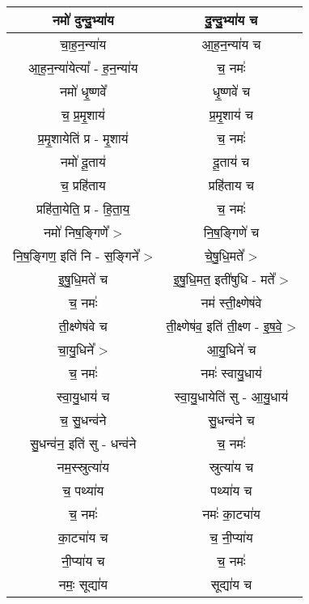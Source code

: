 \subsection{}
{\centering
\begin{longtable}{|c|c|}
\hline
नमो॑ दुन्दु॒भ्या॑य              & दु॒न्दु॒भ्या॑य च\\
\hline
चा॒ह॒न॒न्या॑य                 & आ॒ह॒न॒न्या॑य च\\
\hline
आ॒ह॒न॒न्या॑येत्या᳚ - ह॒न॒न्या॑य      & च॒ नमः॑\\
\hline
नमो॑ धृ॒ष्णवे᳚                 & धृ॒ष्णवे॑ च\\
\hline
च॒ प्र॒मृ॒शाय॑                 & प्र॒मृ॒शाय॑ च\\
\hline
प्र॒मृ॒शायेति॑ प्र - मृ॒शाय॑       & च॒ नमः॑\\
\hline
नमो॑ दू॒ताय॑                 & दू॒ताय॑ च\\
\hline
च॒ प्रहि॑ताय                & प्रहि॑ताय च\\
\hline
प्रहि॑ता॒येति॒ प्र - हि॒ता॒य॒     & च॒ नमः॑\\
\hline
नमो॑ निष॒ङ्गिणे᳚ >            & नि॒ष॒ङ्गिणे॑ च\\
\hline
नि॒ष॒ङ्गिण॒ इति॑ नि - स॒ङ्गिने᳚ > & चे॒षु॒धि॒मते᳚ >\\
\hline
इ॒षु॒धि॒मते॑ च                 & इ॒षु॒धि॒मत॒ इती॑षुधि - मते᳚ >\\
\hline
च॒ नमः॑                    & नम॑ स्ती॒क्ष्णेष॑वे\\
\hline
ती॒क्ष्णेष॑वे च                & ती॒क्ष्णेष॑व॒ इति॑ ती॒क्ष्ण - इ॒ष॒वे॒ >\\
\hline
चा॒यु॒धिने᳚ >                 & आ॒यु॒धिने॑ च\\
\hline
च॒ नमः॑                    & नमः॑ स्वायु॒धाय॑\\
\hline
स्वा॒यु॒धाय॑ च                & स्वा॒यु॒धायेति॑ सु - आ॒यु॒धाय॑\\
\hline
च॒ सु॒धन्व॑ने                  & सु॒धन्व॑ने च\\
\hline
सु॒धन्व॑न॒ इति॑ सु - धन्व॑ने       & च॒ नमः॑\\
\hline
नम॒स्स्रुत्या॑य                & स्रुत्या॑य च\\
\hline
च॒ पथ्या॑य                  & पथ्या॑य च\\
\hline
च॒ नमः॑                    & नमः॑ का॒ट्या॑य\\
\hline
का॒ट्या॑य च                 & च॒ नी॒प्या॑य\\
\hline
नी॒प्या॑य च                 & च॒ नमः॑\\
\hline
नमः॒ सूद्या॑य                & सूद्या॑य च\\

\end{longtable}}
